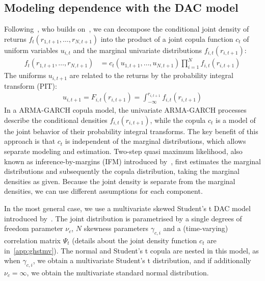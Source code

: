 
\subsection{Modeling dependence with the DAC model} %
\label{sub:copula}

Following~\autocite{ChristoffersenErrunzaJacobLanglois2012}, who builds on~\autocite{Patton2006,Sklar1959}, we can decompose the conditional joint density of returns $f_t(r_{1, t+1}, \ldots, r_{N, t+1})$ into the product of a joint copula function $c_t$ of uniform variables $u_{i,t}$ and the marginal univariate distributions $f_{i,t}(r_{i, t+1})$:
\begin{align}
  f_t(r_{1, t+1}, \ldots, r_{N, t+1}) &=
    c_t(u_{1, t+1}, \ldots, u_{N, t+1}) \prod^N_{i = 1}
    f_{i,t}(r_{i, t + 1})
\end{align}
The uniforms $u_{i, t+1}$ are related to the returns by the probability integral transform (PIT):
\begin{align}
  u_{i, t+1} = F_{i,t}(r_{i, t+1}) =
    \int_{-\infty}^{r_{i, t + 1}} f_{i,t}(r_{i, t+1})
\end{align}
In a ARMA-GARCH copula model, the univariate ARMA-GARCH processes describe the conditional densities $f_{i,t}(r_{i, t+1})$, while the copula $c_t$ is a model of the joint behavior of their probability integral transforms. The key benefit of this approach is that $c_t$ is independent of the marginal distributions, which allows separate modeling and estimation. Two-step quasi maximum likelihood, also known as inference-by-margins (IFM) introduced by~\autocite{Joe1997}, first estimates the marginal distributions and subsequently the copula distribution, taking the marginal densities as given. Because the joint density is separate from the marginal densities, we can use different assumptions for each component.

In the most general case, we use a multivariate skewed Student's t DAC model introduced by~\autocite{ChristoffersenErrunzaJacobLanglois2012}. The joint distribution is parametrised by a single degrees of freedom parameter $\nu_c$, $N$ skewness parameters $\gamma_{c,i}$ and a (time-varying) correlation matrix $\Psi_{t}$ (details about the joint density function $c_t$ are in~\autoref{app:ghstmv}). The normal and Student's t copula are nested in this model, as when $\gamma_{c,i}$, we obtain a multivariate Student's t distribution, and if additionally $\nu_c = \infty$, we obtain the multivariate standard normal distribution.

